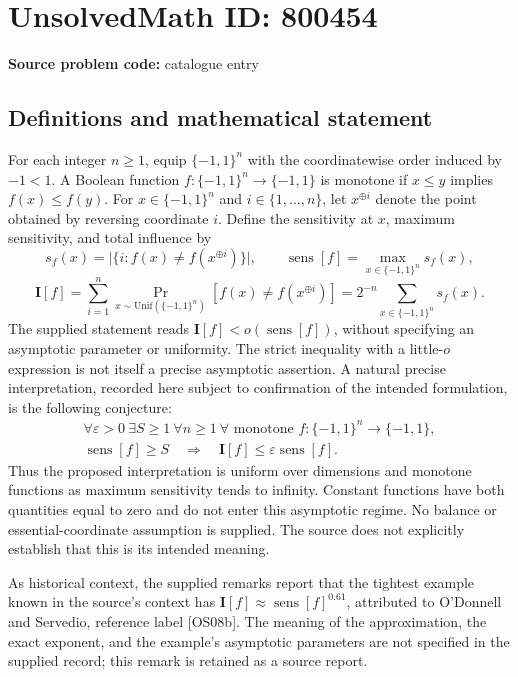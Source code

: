 \documentclass[11pt]{article}
\begin{document}
\section*{UnsolvedMath ID: 800454}
\textbf{Source problem code:} catalogue entry
\subsection{Definitions and mathematical statement}
For each integer \(n\geq 1\), equip \(\{-1,1\}^n\) with the coordinatewise order induced by \(-1<1\). A Boolean function \(f:\{-1,1\}^n\to\{-1,1\}\) is monotone if \(x\leq y\) implies \(f(x)\leq f(y)\). For \(x\in\{-1,1\}^n\) and \(i\in\{1,\ldots,n\}\), let \(x^{\oplus i}\) denote the point obtained by reversing coordinate \(i\). Define the sensitivity at \(x\), maximum sensitivity, and total influence by
\[
s_f(x)=\bigl|\{i:f(x)\neq f(x^{\oplus i})\}\bigr|,\qquad
\operatorname{sens}[f]=\max_{x\in\{-1,1\}^n}s_f(x),
\]
\[
\mathbf I[f]=\sum_{i=1}^n\Pr_{x\sim\mathrm{Unif}(\{-1,1\}^n)}[f(x)\neq f(x^{\oplus i})]
=2^{-n}\sum_{x\in\{-1,1\}^n}s_f(x).
\]
The supplied statement reads \(\mathbf I[f]<o(\operatorname{sens}[f])\), without specifying an asymptotic parameter or uniformity. The strict inequality with a little-\(o\) expression is not itself a precise asymptotic assertion. A natural precise interpretation, recorded here subject to confirmation of the intended formulation, is the following conjecture:
\[
\begin{gathered}
\forall\varepsilon>0\ \exists S\geq 1\ \forall n\geq 1\ \forall\text{ monotone }f:\{-1,1\}^n\to\{-1,1\},\\
\operatorname{sens}[f]\geq S\quad\Longrightarrow\quad
\mathbf I[f]\leq\varepsilon\operatorname{sens}[f].
\end{gathered}
\]
Thus the proposed interpretation is uniform over dimensions and monotone functions as maximum sensitivity tends to infinity. Constant functions have both quantities equal to zero and do not enter this asymptotic regime. No balance or essential-coordinate assumption is supplied. The source does not explicitly establish that this is its intended meaning.

As historical context, the supplied remarks report that the tightest example known in the source's context has \(\mathbf I[f]\approx\operatorname{sens}[f]^{0.61}\), attributed to O'Donnell and Servedio, reference label [OS08b]. The meaning of the approximation, the exact exponent, and the example's asymptotic parameters are not specified in the supplied record; this remark is retained as a source report.
\end{document}
